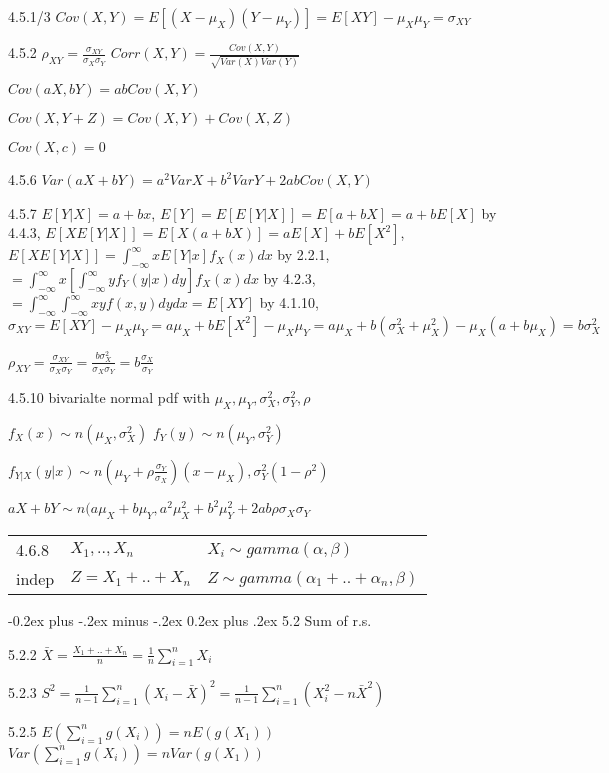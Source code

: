 \documentclass[10pt,landscape]{article}
\makeatletter
\renewcommand{\subsection}{\@startsection{subsection}{2}{0mm}%
                                {-0.2ex plus -.2ex minus -.2ex}%
                                {0.2ex plus .2ex}%
                                {\normalfont\normalsize\bfseries}}
\makeatother
\begin{document}
\begin{multicols}{1}
4.5.1/3 $Cov(X,Y)=E[(X-\mu_X)(Y-\mu_Y)]=E[XY]-\mu_X\mu_Y=\sigma_{XY}$

4.5.2 $\rho_{XY}=\frac{\sigma_{XY}}{\sigma_X\sigma_Y}$ $Corr(X,Y)=\frac{Cov(X,Y)}{\sqrt{Var(X)Var(Y)}}$

$Cov(aX,bY)=abCov(X,Y)$

$Cov(X,Y+Z)=Cov(X,Y)+Cov(X,Z)$

$Cov(X,c)=0$

4.5.6 $Var(aX+bY)=a^2VarX+b^2VarY+2abCov(X,Y)$

4.5.7 $E[Y|X]=a+bx$, $E[Y]=E[E[Y|X]]=E[a+bX]=a+bE[X]$ by 4.4.3, $E[XE[Y|X]]=E[X(a+bX)]=aE[X]+bE[X^2]$, $E[XE[Y|X]]=\int_{-\infty}^{\infty}xE[Y|x]f_X(x)dx$ by 2.2.1, $=\int_{-\infty}^{\infty}x\left[\int_{-\infty}^{\infty}yf_Y(y|x)dy\right]f_X(x)dx$ by 4.2.3,$=\int_{-\infty}^{\infty}\int_{-\infty}^{\infty}xyf(x,y)dydx=E[XY]$ by 4.1.10, $\sigma_{XY}=E[XY]-\mu_X\mu_Y=a\mu_X+bE[X^2]-\mu_X\mu_Y=a\mu_X+b(\sigma_X^2+\mu_X^2)-\mu_X(a+b\mu_X)=b\sigma_X^2$

$\rho_{XY}=\frac{\sigma_{XY}}{\sigma_{X}\sigma_{Y}}=\frac{b\sigma_X^2}{\sigma_{X}\sigma_{Y}}=b\frac{\sigma_X}{\sigma_Y}$

4.5.10 bivarialte normal pdf with $\mu_X,\mu_Y,\sigma_X^2,\sigma_Y^2, \rho$

$f_X(x)\sim n(\mu_X,\sigma^2_X)$ $f_Y(y)\sim n(\mu_Y,\sigma^2_Y)$

$f_{Y|X}(y|x) \sim n(\mu_Y+\rho\frac{\sigma_Y}{\sigma_X})(x−\mu_X),\sigma_Y^2(1-\rho^2)$

$aX+bY\sim n(a\mu_X+b\mu_Y,a^2\mu_X^2+b^2\mu_Y^2+2ab\rho\sigma_X\sigma_Y$

\begin{tabular}{l|l|l}
4.6.8 & $X_1,.., X_n$  & $X_i\sim gamma(\alpha,\beta)$\\
indep & $Z=X_1+..+X_n$ & $Z\sim gamma(\alpha_1+..+\alpha_n,\beta)$
\end{tabular}



\subsection{5.2 Sum of r.s.}

5.2.2 $\bar X=\frac{X_1+..+X_n}{n}=\frac1n\sum_{i=1}^nX_i$

5.2.3 $S^2=\frac1{n-1}\sum_{i=1}^n(X_i-\bar X)^2=\frac1{n-1}\sum_{i=1}^n(X_i^2-n\bar X^2)$

5.2.5 $E\left(\sum_{i=1}^ng(X_i) \right)=nE(g(X_1))$ $Var\left(\sum_{i=1}^ng(X_i) \right)=nVar(g(X_1))$


\end{multicols}
\end{document}
